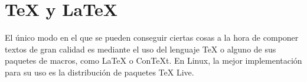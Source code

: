 \chapter{\TeX{} y \LaTeX{}}\label{chapter:tex}
El único modo en el que se pueden conseguir ciertas cosas a la hora de componer textos de gran calidad es
mediante el uso del lenguaje \TeX{} o alguno de sus paquetes de macros, como \LaTeX{} o ConTeXt. En Linux, la
mejor implementación para su uso es la distribución de paquetes \TeX{} Live.


